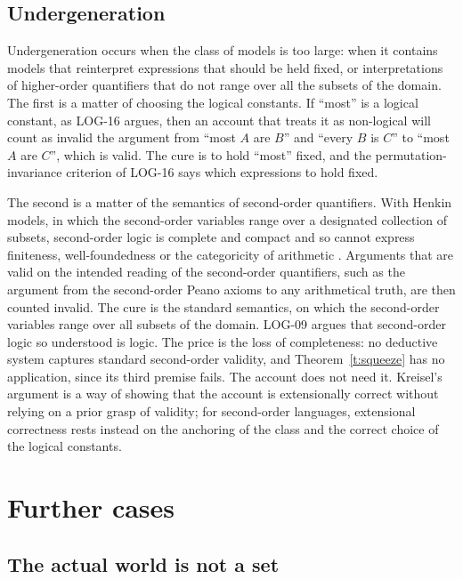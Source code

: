 \documentclass{situationist-preprint}
\begin{document}
\subsection{Undergeneration}

Undergeneration occurs when the class of models is too large: when it contains models that reinterpret expressions that should be held fixed, or interpretations of higher-order quantifiers that do not range over all the subsets of the domain. The first is a matter of choosing the logical constants. If \enquote{most} is a logical constant, as LOG-16 argues, then an account that treats it as non-logical will count as invalid the argument from \enquote{most $A$ are $B$} and \enquote{every $B$ is $C$} to \enquote{most $A$ are $C$}, which is valid. The cure is to hold \enquote{most} fixed, and the permutation-invariance criterion of LOG-16 says which expressions to hold fixed.

The second is a matter of the semantics of second-order quantifiers. With Henkin models, in which the second-order variables range over a designated collection of subsets, second-order logic is complete and compact and so cannot express finiteness, well-foundedness or the categoricity of arithmetic \citep{Shapiro1991}. Arguments that are valid on the intended reading of the second-order quantifiers, such as the argument from the second-order Peano axioms to any arithmetical truth, are then counted invalid. The cure is the standard semantics, on which the second-order variables range over all subsets of the domain. LOG-09 argues that second-order logic so understood is logic. The price is the loss of completeness: no deductive system captures standard second-order validity, and Theorem~\ref{t:squeeze} has no application, since its third premise fails. The account does not need it. Kreisel's argument is a way of showing that the account is extensionally correct without relying on a prior grasp of validity; for second-order languages, extensional correctness rests instead on the anchoring of the class and the correct choice of the logical constants.

\section{Further cases}\label{s:cases}

\subsection{The actual world is not a set}
\end{document}
